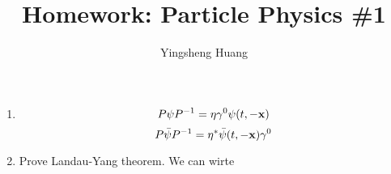 \documentclass{article}
\title{Homework: Particle Physics \#1}
\author{Yingsheng Huang}
\newcommand{\g}{\gamma}
\begin{document}
\maketitle
\begin{enumerate}[\bf1.]
  \item 
  $$P\psi P^{-1}=\eta\g^0\psi(t,-\vb{x})$$
  $$P\bar\psi P^{-1}=\eta^*\bar\psi(t,-\vb{x}) \g^0$$


  \item Prove Landau-Yang theorem.
	We can wirte 

\end{enumerate}
\end{document}
